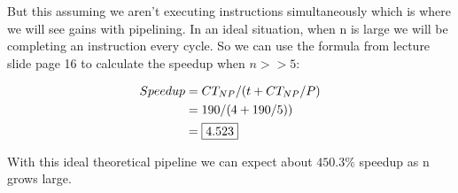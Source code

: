 \documentclass[a4paper, 15pt]{exam}
\begin{document}
\begin{enumerate}
But this assuming we aren't executing instructions simultaneously which is where we will see gains with pipelining. In an ideal situation, when n is large we will be completing an instruction every cycle. So we can use the formula from lecture slide page 16 to calculate the speedup when $n>>5$:

\begin{align*}
	Speedup &= CT_{NP} / (t + CT_{NP}/P) \\
	&= 190 / (4 + 190/5)) \\
	&= \fbox{4.523}
\end{align*}

With this ideal theoretical pipeline we can expect about $450.3\%$ speedup as n grows large. 

\end{enumerate}
\end{document}
